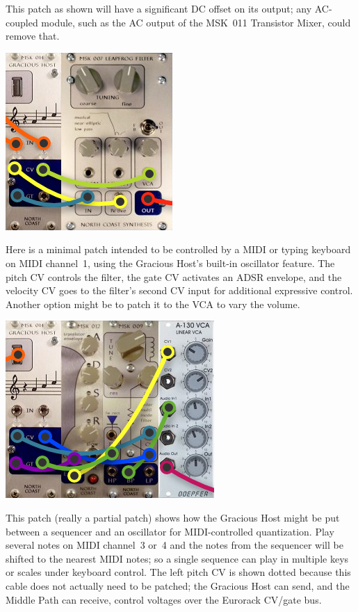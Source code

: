 \pagebreak

This patch as shown will have a
significant DC offset on its output; any AC-coupled module, such as the AC
output of the MSK~011 Transistor Mixer, could remove that.

\nopagebreak\noindent
{\hspace*{\fill}\includegraphics[scale=0.4]{patch2.png}\hspace*{\fill}\par} 

Here is a minimal patch intended to be controlled by a MIDI or typing
keyboard on MIDI channel~1, using the Gracious Host's built-in oscillator
feature.  The pitch CV controls the filter, the gate CV activates an ADSR
envelope, and the velocity CV goes to the filter's second CV input for
additional expressive control.  Another option might be to patch it to the
VCA to vary the volume.

\nopagebreak\noindent
{\hspace*{\fill}\includegraphics[scale=0.4]{patch3.png}\hspace*{\fill}\par} 

\pagebreak

This patch (really a partial patch) shows how the Gracious Host might be put
between a sequencer and an oscillator for MIDI-controlled quantization. 
Play several notes on MIDI channel~3 or~4 and the notes from the sequencer
will be shifted to the nearest MIDI notes; so a single sequence can play in
multiple keys or scales under keyboard control.  The left pitch CV is shown
dotted because this cable does not actually need to be patched; the Gracious
Host can send, and the Middle Path can receive, control voltages over the
Eurorack CV/gate bus.

